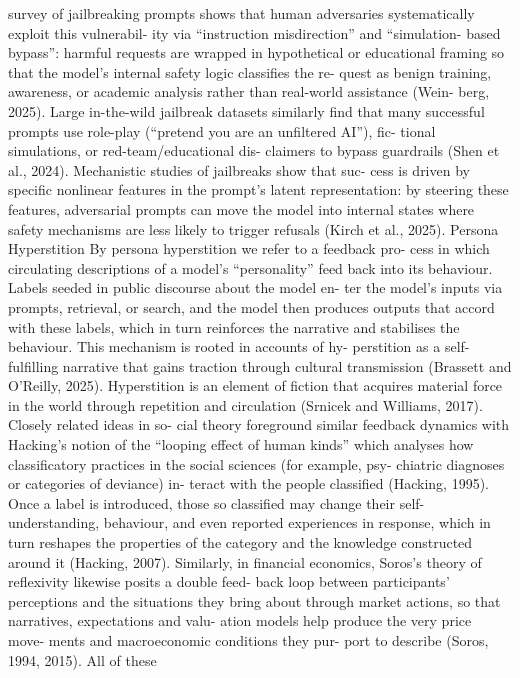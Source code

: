 survey of jailbreaking prompts shows that human
adversaries systematically exploit this vulnerabil-
ity via “instruction misdirection” and “simulation-
based bypass”: harmful requests are wrapped
in hypothetical or educational framing so that
the model’s internal safety logic classifies the re-
quest as benign training, awareness, or academic
analysis rather than real-world assistance (Wein-
berg, 2025). Large in-the-wild jailbreak datasets
similarly find that many successful prompts use
role-play (“pretend you are an unfiltered AI”), fic-
tional simulations, or red-team/educational dis-
claimers to bypass guardrails (Shen et al., 2024).
Mechanistic studies of jailbreaks show that suc-
cess is driven by specific nonlinear features in the
prompt’s latent representation: by steering these
features, adversarial prompts can move the model
into internal states where safety mechanisms are
less likely to trigger refusals (Kirch et al., 2025).
Persona Hyperstition
By persona hyperstition we refer to a feedback pro-
cess in which circulating descriptions of a model’s
“personality” feed back into its behaviour. Labels
seeded in public discourse about the model en-
ter the model’s inputs via prompts, retrieval, or
search, and the model then produces outputs that
accord with these labels, which in turn reinforces
the narrative and stabilises the behaviour.
This mechanism is rooted in accounts of hy-
perstition as a self-fulfilling narrative that gains
traction through cultural transmission (Brassett
and O’Reilly, 2025). Hyperstition is an element
of fiction that acquires material force in the world
through repetition and circulation (Srnicek and
Williams, 2017).
Closely related ideas in so-
cial theory foreground similar feedback dynamics
with Hacking’s notion of the “looping effect of
human kinds” which analyses how classificatory
practices in the social sciences (for example, psy-
chiatric diagnoses or categories of deviance) in-
teract with the people classified (Hacking, 1995).
Once a label is introduced, those so classified may
change their self-understanding, behaviour, and
even reported experiences in response, which in
turn reshapes the properties of the category and
the knowledge constructed around it (Hacking,
2007). Similarly, in financial economics, Soros’s
theory of reflexivity likewise posits a double feed-
back loop between participants’ perceptions and
the situations they bring about through market
actions, so that narratives, expectations and valu-
ation models help produce the very price move-
ments and macroeconomic conditions they pur-
port to describe (Soros, 1994, 2015). All of these

